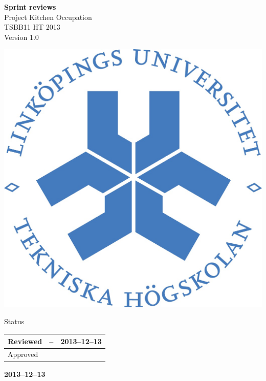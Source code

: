 \documentclass[pdftex, fontsize=11pt, a4paper]{scrbook}
\begin{document}
\begin{titlepage}
\thispagestyle{empty}
\begin{center}
	\vspace*{4\baselineskip}

	\textbf{\huge Sprint reviews} \\
	\vspace*{0.5\baselineskip}
	{\large  Project Kitchen Occupation} \\
	\vspace*{0.5\baselineskip}
	{\large  TSBB11 HT 2013} \\
	\vspace*{0.5\baselineskip}
	{\large  Version 1.0}


	\vspace*{6\baselineskip}
	\includegraphics[width=0.4\linewidth]{lith_sigill_col}


	\normalfont
	\small
	\vfill


	{\large  Status} \\
	\vspace*{1\baselineskip}
	\begin{tabular}{|p{4cm}|p{4cm}|p{4cm}|}
		\hline
		Reviewed & -- & 2013--12--13 \\
		\hline
		Approved &   &    \\
		\hline
	\end{tabular}


	\vspace*{2\baselineskip}

	\textbf{2013--12--13} \\
	[2\baselineskip]
\end{center}

\end{titlepage}
\end{document}
